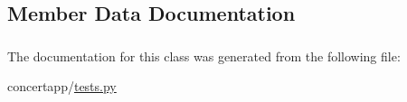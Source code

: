 \subsection{Member Data Documentation}
\hypertarget{classconcertapp_1_1tests_1_1_concert_test_a7b7359c53beed37ac59a765bde668852}{
\subsubsection[{client}]{}}
\label{classconcertapp_1_1tests_1_1_concert_test_a7b7359c53beed37ac59a765bde668852}


The documentation for this class was generated from the following file:\begin{DoxyCompactItemize}
\item 
concertapp/\hyperlink{tests_8py}{tests.py}\end{DoxyCompactItemize}
